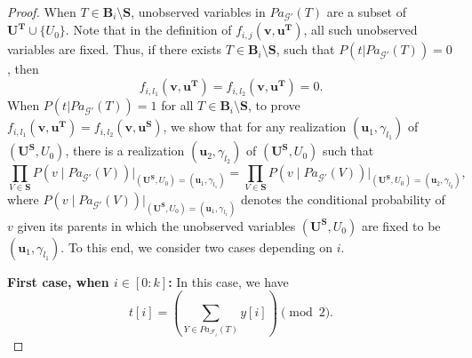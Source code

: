 \documentclass[accepted]{uai2022}
\newcommand{\Pa}[2]{\textit{Pa}_{#2}(#1)}
\newcommand{\U}[0]{\mathbf{U}}
\newcommand{\B}[0]{\mathbf{B}}
\newcommand{\T}[0]{\mathbf{T}}
\newcommand{\G}[0]{\mathcal{G}}
\newcommand{\F}[0]{\mathcal{F}}
\begin{document}
\begin{proof}
        When $T\in \B_i\setminus\mathbf{S}$, unobserved variables in $\Pa{T}{\G'}$ are a subset of $\U^{\T}\cup\{U_0\}$. Note that in the definition of $f_{i, j}(\mathbf{v}, \mathbf{u}^{\mathbf{T}})$, all such unobserved variables are fixed. 
        Thus, if there exists $T\in \B_i\setminus\mathbf{S}$, such that $P(t|\Pa{T}{\G'})=0$, then 
        \begin{equation*}
        f_{i, l_1}(\mathbf{v}, \mathbf{u}^{\mathbf{T}})=f_{i, l_2}(\mathbf{v}, \mathbf{u}^{\mathbf{T}})=0.
        \end{equation*}
        When $P(t|\Pa{T}{\G'})=1$ for all $T\in \B_i\setminus\mathbf{S}$,
        to prove $f_{i, l_1}(\mathbf{v}, \mathbf{u}^{\mathbf{T}})=f_{i, l_2}(\mathbf{v}, \mathbf{u}^{\mathbf{S}})$, we show that for any realization $(\textbf{u}_1,\gamma_{l_1})$ of $(\U^{\mathbf{S}},U_0)$, there is a realization $(\textbf{u}_2,\gamma_{l_2})$  of $(\U^{\mathbf{S}},U_0)$ such that 
        \begin{equation*}
            \prod_{V \in \mathbf{S}} P(v \mid \Pa{V}{\G'})\Big|_{(\U^{\mathbf{S}},U_0)=(\textbf{u}_1,\gamma_{l_1})}=\prod_{V \in \mathbf{S}} P(v \mid \Pa{V}{\G'})\Big|_{(\U^{\mathbf{S}},U_0)=(\textbf{u}_2,\gamma_{l_2})},
        \end{equation*}
        where $P(v \mid \Pa{V}{\G'})\Big|_{(\U^{\mathbf{S}},U_0)=(\textbf{u}_1,\gamma_{l_1})}$ denotes the conditional probability of $v$ given its parents in which the unobserved variables $(\U^{\mathbf{S}},U_0)$ are fixed to be  $(\textbf{u}_1,\gamma_{l_1})$.
        To this end, we consider two cases depending on $i$. 
        
        \textbf{First case, when $i \in [0:k]$:} 
        In this case, we have
        \begin{equation}\label{eq: tmp1}
            t[i] = \left( \sum_{Y \in \Pa{T}{\F_i}} y[i] \right) \pmod{2}.
        \end{equation}
        

\end{proof}
\end{document}
